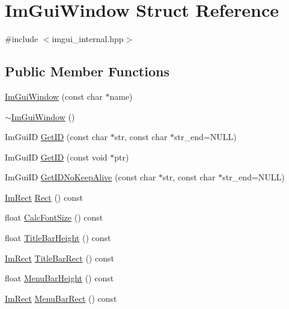 \hypertarget{struct_im_gui_window}{}\section{Im\+Gui\+Window Struct Reference}
\label{struct_im_gui_window}


{\ttfamily \#include $<$imgui\+\_\+internal.\+hpp$>$}

\subsection*{Public Member Functions}
\begin{DoxyCompactItemize}
\item 
\hyperlink{struct_im_gui_window_abbc943558e96c8895237f0b55a66751b}{Im\+Gui\+Window} (const char $\ast$name)
\item 
\hyperlink{struct_im_gui_window_a8e81d730c3a39a71e6b6ca4654451c53}{$\sim$\+Im\+Gui\+Window} ()
\item 
Im\+Gui\+ID \hyperlink{struct_im_gui_window_a66400a63bc0b54d7d29e08d1b1b1a42b}{Get\+ID} (const char $\ast$str, const char $\ast$str\+\_\+end=N\+U\+LL)
\item 
Im\+Gui\+ID \hyperlink{struct_im_gui_window_aae21dffb343cabca9414499b827912a8}{Get\+ID} (const void $\ast$ptr)
\item 
Im\+Gui\+ID \hyperlink{struct_im_gui_window_adc0a43f74a0b53a15a4bc4fea05524fe}{Get\+I\+D\+No\+Keep\+Alive} (const char $\ast$str, const char $\ast$str\+\_\+end=N\+U\+LL)
\item 
\hyperlink{struct_im_rect}{Im\+Rect} \hyperlink{struct_im_gui_window_a147da28bf5d167cbe0a363c4a578dea1}{Rect} () const
\item 
float \hyperlink{struct_im_gui_window_a6881ed65e208fb6e015d3ae6bccfc794}{Calc\+Font\+Size} () const
\item 
float \hyperlink{struct_im_gui_window_ad1580cc8b5bdf981c6ed2eb22ecd7dbb}{Title\+Bar\+Height} () const
\item 
\hyperlink{struct_im_rect}{Im\+Rect} \hyperlink{struct_im_gui_window_a06884e1bc80e460e51e1626b5b976196}{Title\+Bar\+Rect} () const
\item 
float \hyperlink{struct_im_gui_window_acfb8bdad2e3ea6102589813ae32d0364}{Menu\+Bar\+Height} () const
\item 
\hyperlink{struct_im_rect}{Im\+Rect} \hyperlink{struct_im_gui_window_a59df76c1445aaaf0b43456c83c1a88e5}{Menu\+Bar\+Rect} () const
\end{DoxyCompactItemize}
